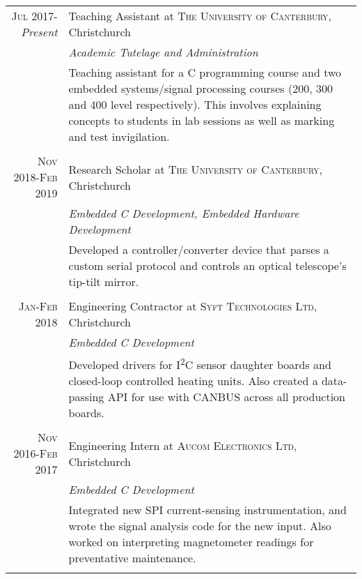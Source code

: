 \documentclass[a4paper,10pt]{article} %
\begin{document}
\begin{tabular}{r|p{11cm}}
\textsc{Jul 2017}-\emph{Present} & Teaching Assistant at \textsc{The University of Canterbury}, Christchurch \\
& \emph{Academic Tutelage and Administration} \\
& \footnotesize{Teaching assistant for a C programming course and two embedded systems/signal processing courses (200, 300 and 400 level respectively). This involves explaining concepts to students in lab sessions as well as marking and test invigilation. } \\
\multicolumn{2}{c}{} \\


\textsc{Nov 2018-Feb 2019} & Research Scholar at \textsc{The University of Canterbury}, Christchurch \\
& \emph{Embedded C Development, Embedded Hardware Development}\\
& \footnotesize{Developed a controller/converter device that parses a custom serial protocol and controls an optical telescope's tip-tilt mirror. }\\
\multicolumn{2}{c}{} \\


\textsc{Jan-Feb 2018} & Engineering Contractor at \textsc{Syft Technologies Ltd}, Christchurch \\
& \emph{Embedded C Development}\\
& \footnotesize{Developed drivers for I\textsuperscript{2}C sensor daughter boards and closed-loop controlled heating units. Also created a data-passing API for use with CANBUS across all production boards. }\\
\multicolumn{2}{c}{} \\


\textsc{Nov 2016-Feb 2017} & Engineering Intern at \textsc{Aucom Electronics Ltd}, Christchurch \\
& \emph{Embedded C Development}\\
& \footnotesize{Integrated new SPI current-sensing instrumentation, and wrote the signal analysis code for the new input. Also worked on interpreting magnetometer readings for preventative maintenance. } \\
\multicolumn{2}{c}{} \\


\end{tabular}
\end{document}
